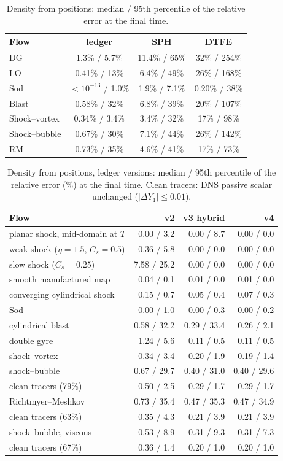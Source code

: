 \documentclass[11pt]{article}
\theoremstyle{definition}\newtheorem{definition}{Definition}\theoremstyle{remark}\newtheorem{remark}{Remark}
\begin{document}
\begin{table}[t]\centering\small\caption{Density from positions: median / 95th percentile of the relative error at the final time.}\label{tab:density}
\begin{tabular}{lccc}\toprule
Flow & ledger & SPH & DTFE\\\midrule
DG & 1.3\% / 5.7\% & 11.4\% / 65\% & 32\% / 254\%\\
LO & 0.41\% / 13\% & 6.4\% / 49\% & 26\% / 168\%\\
Sod & $<10^{-13}$ / 1.0\% & 1.9\% / 7.1\% & 0.20\% / 38\%\\
Blast & 0.58\% / 32\% & 6.8\% / 39\% & 20\% / 107\%\\
Shock--vortex & 0.34\% / 3.4\% & 3.4\% / 32\% & 17\% / 98\%\\
Shock--bubble & 0.67\% / 30\% & 7.1\% / 44\% & 26\% / 142\%\\
RM & 0.73\% / 35\% & 4.6\% / 41\% & 17\% / 73\%\\\bottomrule
\end{tabular}\end{table}
\begin{table}[t]\centering\small\caption{Density from positions, ledger versions: median / 95th percentile of the relative error (\%) at the final time. Clean tracers: DNS passive scalar unchanged ($|\Delta Y_1|\le0.01$).}\label{tab:v4}
\begin{tabular}{@{}lrrr@{}}\toprule
Flow & v2 & v3 hybrid & v4\\\midrule
planar shock, mid-domain at $T$ & 0.00 / 3.2 & 0.00 / 8.7 & 0.00 / 0.0\\
weak shock ($\eta=1.5$, $C_s=0.5$) & 0.36 / 5.8 & 0.00 / 0.0 & 0.00 / 0.0\\
slow shock ($C_s=0.25$) & 7.58 / 25.2 & 0.00 / 0.0 & 0.00 / 0.0\\
smooth manufactured map & 0.04 / 0.1 & 0.01 / 0.0 & 0.01 / 0.0\\
converging cylindrical shock & 0.15 / 0.7 & 0.05 / 0.4 & 0.07 / 0.3\\
Sod & 0.00 / 1.0 & 0.00 / 0.3 & 0.00 / 0.2\\
cylindrical blast & 0.58 / 32.2 & 0.29 / 33.4 & 0.26 / 2.1\\
double gyre & 1.24 / 5.6 & 0.11 / 0.5 & 0.11 / 0.5\\
shock--vortex & 0.34 / 3.4 & 0.20 / 1.9 & 0.19 / 1.4\\
shock--bubble & 0.67 / 29.7 & 0.40 / 31.0 & 0.40 / 29.6\\
\quad clean tracers (79\%) & 0.50 / 2.5 & 0.29 / 1.7 & 0.29 / 1.7\\
Richtmyer--Meshkov & 0.73 / 35.4 & 0.47 / 35.3 & 0.47 / 34.9\\
\quad clean tracers (63\%) & 0.35 / 4.3 & 0.21 / 3.9 & 0.21 / 3.9\\
shock--bubble, viscous & 0.53 / 8.9 & 0.31 / 9.3 & 0.31 / 7.3\\
\quad clean tracers (67\%) & 0.36 / 1.4 & 0.20 / 1.0 & 0.20 / 1.0\\
\bottomrule\end{tabular}\end{table}
\end{document}
